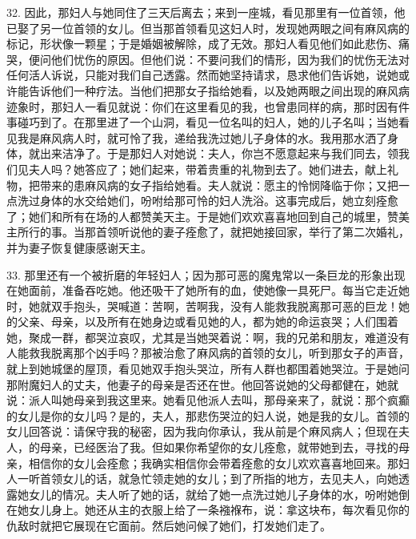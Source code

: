 32. 因此，那妇人与她同住了三天后离去；来到一座城，看见那里有一位首领，他已娶了另一位首领的女儿。但当那首领看见这妇人时，发现她两眼之间有麻风病的标记，形状像一颗星；于是婚姻被解除，成了无效。那妇人看见他们如此悲伤、痛哭，便问他们忧伤的原因。但他们说：不要问我们的情形，因为我们的忧伤无法对任何活人诉说，只能对我们自己透露。然而她坚持请求，恳求他们告诉她，说她或许能告诉他们一种疗法。当他们把那女子指给她看，以及她两眼之间出现的麻风病迹象时，那妇人一看见就说：你们在这里看见的我，也曾患同样的病，那时因有件事碰巧到了。在那里进了一个山洞，看见一位名叫的妇人，她的儿子名叫；当她看见我是麻风病人时，就可怜了我，递给我洗过她儿子身体的水。我用那水洒了身体，就出来洁净了。于是那妇人对她说：夫人，你岂不愿意起来与我们同去，领我们见夫人吗？她答应了；她们起来，带着贵重的礼物到去了。她们进去，献上礼物，把带来的患麻风病的女子指给她看。夫人就说：愿主的怜悯降临于你；又把一点洗过身体的水交给她们，吩咐给那可怜的妇人洗浴。这事完成后，她立刻痊愈了；她们和所有在场的人都赞美天主。于是她们欢欢喜喜地回到自己的城里，赞美主所行的事。当那首领听说他的妻子痊愈了，就把她接回家，举行了第二次婚礼，并为妻子恢复健康感谢天主。\par

33. 那里还有一个被折磨的年轻妇人；因为那可恶的魔鬼常以一条巨龙的形象出现在她面前，准备吞吃她。他还吸干了她所有的血，使她像一具死尸。每当它走近她时，她就双手抱头，哭喊道：苦啊，苦啊我，没有人能救我脱离那可恶的巨龙！她的父亲、母亲，以及所有在她身边或看见她的人，都为她的命运哀哭；人们围着她，聚成一群，都哭泣哀叹，尤其是当她哭着说：啊，我的兄弟和朋友，难道没有人能救我脱离那个凶手吗？那被治愈了麻风病的首领的女儿，听到那女子的声音，就上到她城堡的屋顶，看见她双手抱头哭泣，所有人群也都围着她哭泣。于是她问那附魔妇人的丈夫，他妻子的母亲是否还在世。他回答说她的父母都健在，她就说：派人叫她母亲到我这里来。她看见他派人去叫，那母亲来了，就说：那个疯癫的女儿是你的女儿吗？是的，夫人，那悲伤哭泣的妇人说，她是我的女儿。首领的女儿回答说：请保守我的秘密，因为我向你承认，我从前是个麻风病人；但现在夫人，的母亲，已经医治了我。但如果你希望你的女儿痊愈，就带她到去，寻找的母亲，相信你的女儿会痊愈；我确实相信你会带着痊愈的女儿欢欢喜喜地回来。那妇人一听首领女儿的话，就急忙领走她的女儿；到了所指的地方，去见夫人，向她透露她女儿的情况。夫人听了她的话，就给了她一点洗过她儿子身体的水，吩咐她倒在她女儿身上。她还从主的衣服上给了一条襁褓布，说：拿这块布，每次看见你的仇敌时就把它展现在它面前。然后她问候了她们，打发她们走了。\par


